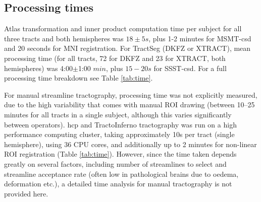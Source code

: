\subsection{Processing times}

Atlas transformation and inner product computation time per subject for all three tracts and both hemispheres was $18\pm5 s$, plus 1-2 minutes for MSMT-\gls{csd} and 20 seconds for MNI registration.
For TractSeg (DKFZ or XTRACT), mean processing time (for all tracts, 72 for DKFZ and 23 for XTRACT, both hemispheres) was 4:00$\pm$1:00 $min$, plus $15-20 s$ for SSST-\gls{csd}.
For a full processing time breakdown see Table \ref{tab:time}.

For manual streamline tractography, processing time was not explicitly measured, due to the high variability that comes with manual ROI drawing (between 10--25 minutes for all tracts in a single subject, although this varies significantly between operators).
\Gls{hcp} and TractoInferno tractography was run on a high performance computing cluster, taking approximately 10s per tract (single hemisphere), using 36 CPU cores, and additionally up to 2 minutes for non-linear ROI registration (Table \ref{tab:time}).
However, since the time taken depends greatly on several factors, including number of streamlines to select and streamline acceptance rate (often low in pathological brains due to oedema, deformation etc.), a detailed time analysis for manual tractography is not provided here.

